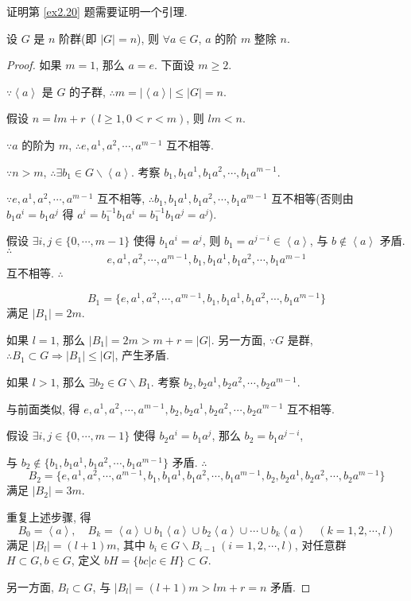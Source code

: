 \documentclass[color=black,device=normal,lang=cn,mode=geye]{elegantnote}
\begin{document}
证明第 \ref{ex2.20} 题需要证明一个引理.
\begin{lemma}\label{l4.4}
    设 $G$ 是 $n$ 阶群(即 $|G|=n$), 则 $\forall a\in G$, $a$ 的阶 $m$ 整除 $n$.
\end{lemma}
\begin{proof}
    如果 $m=1$, 那么 $a=e$. 下面设 $m\geq2$.

    $\because\left<a\right>$ 是 $G$ 的子群, $\therefore m=|\left<a\right>|\leq|G|=n$.
    
    假设 $n=lm+r\ (l\geq1,0<r<m)$, 则 $lm<n$.
    
    $\because a$ 的阶为 $m$, $\therefore e,a^1,a^2,\cdots,a^{m-1}$ 互不相等.

    $\because n>m$, $\therefore\exists b_1\in G\backslash\left<a\right>$. 考察 $b_1,b_1a^1,b_1a^2,\cdots,b_1a^{m-1}$.
    
    $\because e,a^1,a^2,\cdots,a^{m-1}$ 互不相等, $\therefore b_1,b_1a^1,b_1a^2,\cdots,b_1a^{m-1}$ 互不相等(否则由 $b_1a^i=b_1a^j$ 得 $a^i=b_1^{-1}b_1a^i=b_1^{-1}b_1a^j=a^j$).

    假设 $\exists i,j\in\{0,\cdots,m-1\}$ 使得 $b_1a^i=a^j$, 则 $b_1=a^{j-i}\in\left<a\right>$, 与 $b\notin\left<a\right>$ 矛盾. $\therefore$
    \[e,a^1,a^2,\cdots,a^{m-1},b_1,b_1a^1,b_1a^2,\cdots,b_1a^{m-1}\]
    互不相等. $\therefore$

    \[B_1=\{e,a^1,a^2,\cdots,a^{m-1},b_1,b_1a^1,b_1a^2,\cdots,b_1a^{m-1}\}\]
    满足 $|B_1|=2m$.

    如果 $l=1$, 那么 $|B_1|=2m>m+r=|G|$. 另一方面, $\because G$ 是群, $\therefore B_1\subset G\Rightarrow|B_1|\leq|G|$, 产生矛盾.

    如果 $l>1$, 那么 $\exists b_2\in G\backslash B_1$. 考察 $b_2,b_2a^1,b_2a^2,\cdots,b_2a^{m-1}$.

    与前面类似, 得 $e,a^1,a^2,\cdots,a^{m-1},b_2,b_2a^1,b_2a^2,\cdots,b_2a^{m-1}$ 互不相等.

    假设 $\exists i,j\in\{0,\cdots,m-1\}$ 使得 $b_2a^i=b_1a^j$, 那么 $b_2=b_1a^{j-i}$,
    
    与 $b_2\notin\{b_1,b_1a^1,b_1a^2,\cdots,b_1a^{m-1}\}$ 矛盾. $\therefore$
    \[B_2=\{e,a^1,a^2,\cdots,a^{m-1},b_1,b_1a^1,b_1a^2,\cdots,b_1a^{m-1},b_2,b_2a^1,b_2a^2,\cdots,b_2a^{m-1}\}\]
    满足 $|B_2|=3m$.

    重复上述步骤, 得
    \[B_0=\left<a\right>,\quad B_k=\left<a\right>\cup b_1\left<a\right>\cup b_2\left<a\right>\cup\cdots\cup b_k\left<a\right>\quad(k=1,2,\cdots,l)\]
    满足 $|B_l|=(l+1)m$, 其中 $b_i\in G\backslash B_{i-1}\ (i=1,2,\cdots,l)$, 对任意群 $H\subset G,b\in G$, 定义 $bH=\{bc|c\in H\}\subset G$.

    另一方面, $B_l\subset G$, 与 $|B_l|=(l+1)m>lm+r=n$ 矛盾.
\end{proof}
\end{document}
